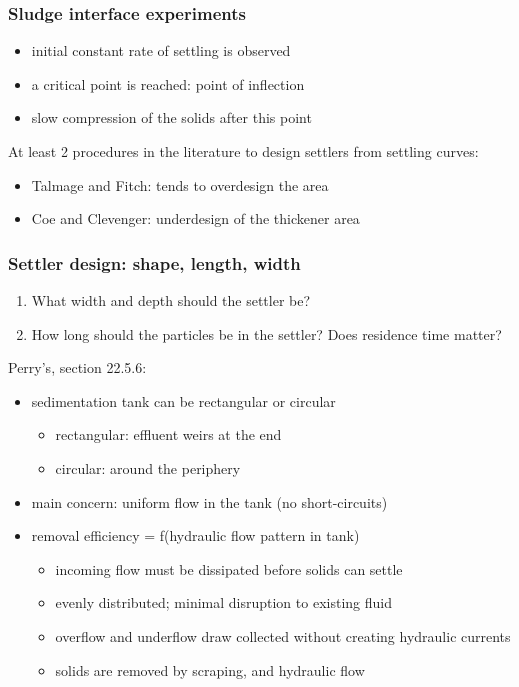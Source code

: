 \begin{frame}\frametitle{Sludge interface experiments}
	\begin{itemize}
		\item	initial constant rate of settling is observed
		\item	a critical point is reached: point of inflection
		\item	slow compression of the solids after this point
	\end{itemize}
	\vspace{12pt}
	At least 2 procedures in the literature to design settlers from settling curves:
	\begin{itemize}
		\item	Talmage and Fitch: tends to overdesign the area
		\item	Coe and Clevenger: underdesign of the thickener area 
	\end{itemize}

	\vspace{12pt}	
	{\color{myGreen}{In practice: we will rely on outside consultants and civil engineers, most likely, to size and design the unit. Else see the references at end for more details.}}
\end{frame}

\begin{frame}\frametitle{Settler design: shape, length, width}
	\begin{enumerate}
		\item	What width and depth should the settler be?
		\item	How long should the particles be in the settler? Does residence time matter?
	\end{enumerate}
	
	Perry's, section 22.5.6:
	\begin{itemize}
		\item	sedimentation tank can be rectangular or circular
		\begin{itemize}
			\item	rectangular: effluent weirs at the end 
			\item	circular: around the periphery 
		\end{itemize}
		\item	main concern: uniform flow in the tank (no short-circuits)		
		\item	removal efficiency = f(hydraulic flow pattern in tank)
		\begin{itemize}
			\item	incoming flow must be dissipated before solids can settle
			\item	evenly distributed; minimal disruption to existing fluid
			\item	overflow and underflow draw collected without creating hydraulic currents
			\item	solids are removed by scraping, and hydraulic flow
		\end{itemize}
	\end{itemize}
\end{frame}

